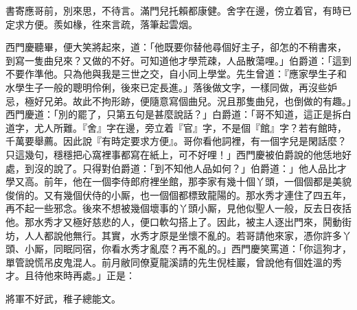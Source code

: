 \begin{myquote}
書寄應哥前，別來思，不待言。滿門兒托賴都康健。舍字在邊，傍立着官，有時已定求方便。羨如椽，徃來言疏，落筆起雲烟。
\end{myquote}

西門慶聽畢，便大笑將起來，道：「他既要你替他尋個好主子，卻怎的不稍書來，到寫一隻曲兒來？又做的不好。可知道他才學荒疎，人品散蕩哩。」伯爵道：「這到不要作準他。只為他與我是三世之交，自小同上學堂。先生曾道：『應家學生子和水學生子一般的聰明伶俐，後來已定長進。」落後做文字，一樣同做，再沒些妒忌，極好兄弟。故此不拘形跡，{}便隨意寫個曲兒。況且那隻曲兒，也倒做的有趣。」西門慶道：「別的罷了，只第五句是甚麼說話？」白爵道：「哥不知道，這正是拆白道字，尤人所難。『舍』字在邊，旁立着『官』字，不是個『館』字？若有館時，千萬要舉薦。因此說『有時定要求方便』。哥你看他詞裡，有一個字兒是閑話麼？只這幾句，穩穩把心窩裡事都寫在紙上，可不好哩！」西門慶被伯爵說的他恁地好處，到沒的說了。只得對伯爵道：「到不知他人品如何？」伯爵道：」他人品比才學又高。前年，他在一個李侍郎府裡坐館，那李家有幾十個丫頭，一個個都是美貌俊俏的。又有幾個伏侍的小厮，也一個個都標致龍陽的。那水秀才連住了四五年，再不起一些邪念。後來不想被幾個壞事的丫頭小厮，見他似聖人一般，反去日夜括他。那水秀才又極好慈悲的人，便口軟勾搭上了。{}因此，被主人逐出門來，鬨動街坊，人人都說他無行。其實，水秀才原是坐懷不亂的。若哥請他來家，憑你許多丫頭、小厮，同眠同宿，你看水秀才亂麼？再不亂的。」西門慶笑罵道：「你這狗才，單管說慌吊皮鬼混人。前月敝同僚夏龍溪請的先生倪桂巖，曾說他有個姓溫的秀才。且待他來時再處。」正是：

\begin{myquote}
將軍不好武，稚子總能文。
\end{myquote}


